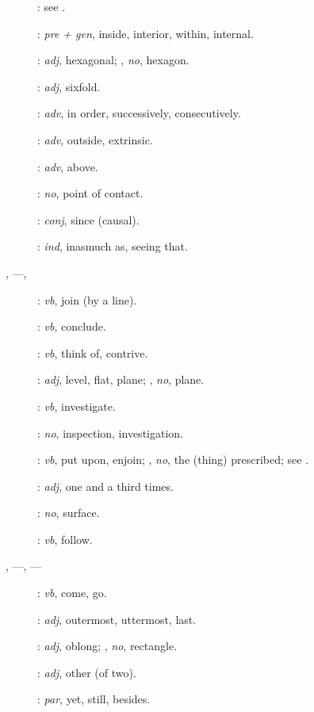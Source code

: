 {\begin{description}
\item[]: see .
\item[]: {\em pre + gen}, inside, interior, within, internal.
\item[]: {\em adj}, hexagonal; ,
{\em no}, hexagon.
\item[]: {\em adj}, sixfold.
\item[]: {\em adv}, in order, successively, consecutively.
\item[]: {\em adv}, outside, extrinsic.
\item[]: {\em adv}, above.
\item[]: {\em no}, point of contact.
\item[]: {\em conj}, since (causal).
\item[]: {\em ind}, inasmuch as, seeing that.
\item[, ---, ] : {\em vb}, join (by a line).
\item[]: {\em vb}, conclude.
\item[]: {\em vb}, think of, contrive.
\item[]: {\em adj}, level, flat, plane; , {\em no}, plane.
\item[]: {\em vb}, investigate.
\item[]: {\em no}, inspection, investigation.
\item[]: {\em vb}, put upon, enjoin; , {\em no}, the (thing) prescribed; see .
\item[]: {\em adj}, one and a third times. 
\item[]: {\em no}, surface.
\item[]: {\em vb}, follow.
\item[, ---,  ---]: {\em vb}, come, go.
\item[]: {\em  adj}, outermost, uttermost, last.
\item[]: {\em adj}, oblong; , {\em no}, rectangle.
\item[]: {\em adj},  other (of two).
\item[]: {\em par}, yet, still, besides.

\end{description}}
